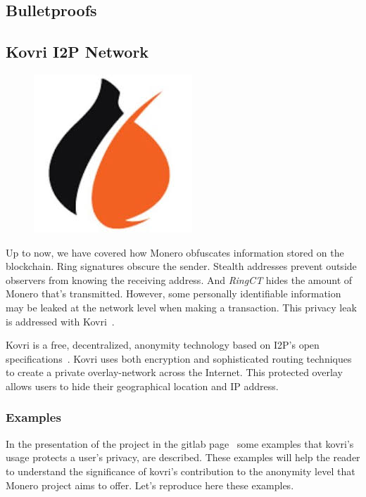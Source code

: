\subsection{Bulletproofs}


\subsection{Kovri I2P Network} \label{sec:Kovri}
\begin{figure}
\centering
\includegraphics[height=0.28\textwidth]{Images/Kovri/kovri.jpg}
\end{figure}
Up to now, we have covered how Monero obfuscates information stored on the blockchain. Ring signatures obscure the sender. Stealth addresses prevent outside observers from knowing the receiving address. And \emph{RingCT} hides the amount of Monero that's transmitted. However, some personally identifiable information may be leaked at the network level when making a transaction. This privacy leak is addressed with Kovri~\cite{kovri}.

Kovri is a free, decentralized, anonymity technology based on I2P's open specifications~\cite{i2p}. Kovri uses both encryption and sophisticated routing techniques to create a private overlay-network across the Internet. This protected overlay allows users to hide their geographical location and IP address.

\subsubsection{Examples}
In the presentation of the project in the gitlab page~\cite{git_kovri} some examples that kovri's usage protects a user's privacy, are described. These examples will help the reader to understand the significance of kovri's contribution to the anonymity level that Monero project aims to offer. Let's reproduce here these examples.

